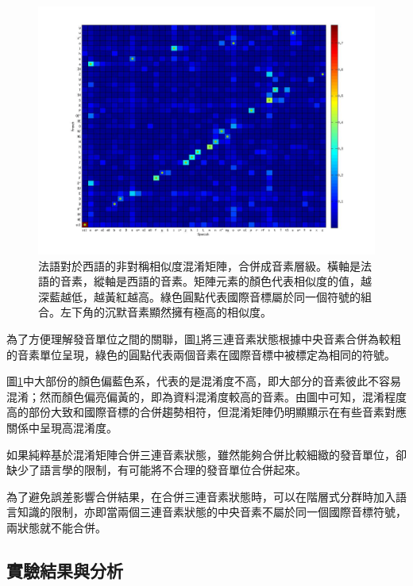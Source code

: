 \begin{figure}[!h]
\centering
\includegraphics[scale=0.3]{images/chap4_CM_IPA}
\caption{法語對於西語的非對稱相似度混淆矩陣，合併成音素層級。橫軸是法語的音素，縱軸是西語的音素。矩陣元素的顏色代表相似度的值，越深藍越低，越黃紅越高。綠色圓點代表國際音標屬於同一個符號的組合。左下角的沉默音素顯然擁有極高的相似度。}
\label{fig:chap4_CM_IPA}
\end{figure}

為了方便理解發音單位之間的關聯，圖\ref{fig:chap4_CM_IPA}將三連音素狀態根據中央音素合併為較粗的音素單位呈現，綠色的圓點代表兩個音素在國際音標中被標定為相同的符號。

圖\ref{fig:chap4_CM_IPA}中大部份的顏色偏藍色系，代表的是混淆度不高，即大部分的音素彼此不容易混淆；然而顏色偏亮偏黃的，即為資料混淆度較高的音素。由圖中可知，混淆程度高的部份大致和國際音標的合併趨勢相符，但混淆矩陣仍明顯顯示在有些音素對應關係中呈現高混淆度。

如果純粹基於混淆矩陣合併三連音素狀態，雖然能夠合併比較細緻的發音單位，卻缺少了語言學的限制，有可能將不合理的發音單位合併起來。

為了避免誤差影響合併結果，在合併三連音素狀態時，可以在階層式分群時加入語言知識的限制，亦即當兩個三連音素狀態的中央音素不屬於同一個國際音標符號，兩狀態就不能合併。

\subsection{實驗結果與分析}

